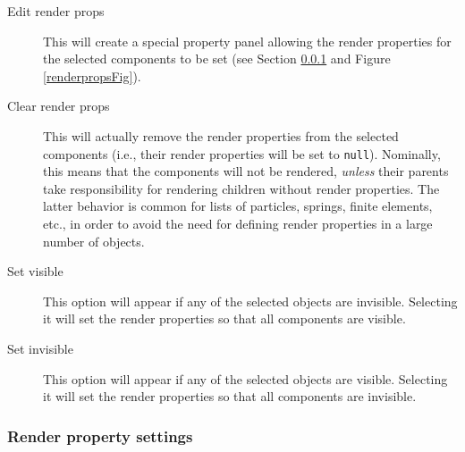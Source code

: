 \documentclass{article}
\begin{document}
\begin{description}

\item[Edit render props]\mbox{}

This will create a special property panel allowing the render properties for
the selected components to be set (see Section \ref{renderPropSettingsSec}
and Figure \ref{renderpropsFig}).

\item[Clear render props]\mbox{}

This will actually remove the render properties
from the selected components (i.e., their render properties will be
set to {\tt null}).  Nominally, this means that the components will not be
rendered, {\it unless} their parents take responsibility for rendering
children without render properties. The latter behavior is common for
lists of particles, springs, finite elements, etc., in order to
avoid the need for defining render properties in a large number
of objects.

\item[Set visible]\mbox{}

This option will appear if any of the selected objects are
invisible. Selecting it will set the render properties so
that all components are visible.

\item[Set invisible]\mbox{}

This option will appear if any of the selected objects are
visible. Selecting it will set the render properties so
that all components are invisible.

\end{description}

\subsubsection{Render property settings}
\label{renderPropSettingsSec}
\end{document}
